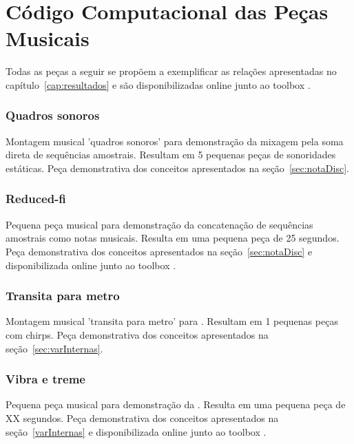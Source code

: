 \chapter{Código Computacional das Peças Musicais}
\label{cap:codigoPecas}
Todas as peças a seguir se propõem a exemplificar as relações apresentadas no capítulo~\ref{cap:resultados} e são disponibilizadas online junto ao toolbox \massa.\cite{MASSA}


\subsection{Quadros sonoros}\label{ap:quadros}
Montagem musical 'quadros sonoros' para demonstração da mixagem pela soma direta de sequências amostrais. Resultam em 5 pequenas peças de sonoridades estáticas. Peça demonstrativa dos conceitos apresentados na seção~\ref{sec:notaDisc}.

\subsection{Reduced-fi}\label{ap:reduced}
Pequena peça musical para demonstração da concatenação de sequências amostrais como notas musicais. Resulta em uma pequena peça de 25 segundos. Peça demonstrativa dos conceitos apresentados na seção~\ref{sec:notaDisc} e disponibilizada online junto ao toolbox \massa.



\subsection{Transita para metro}\label{ap:transita}
Montagem musical 'transita para metro' para . Resultam em 1 pequenas peças com chirps. Peça demonstrativa dos conceitos apresentados na seção~\ref{sec:varInternas}.

\subsection{Vibra e treme}\label{ap:vibra}
Pequena peça musical para demonstração da . Resulta em uma pequena peça de XX segundos. Peça demonstrativa dos conceitos apresentados na seção~\ref{varInternas} e disponibilizada online junto ao toolbox \massa.





